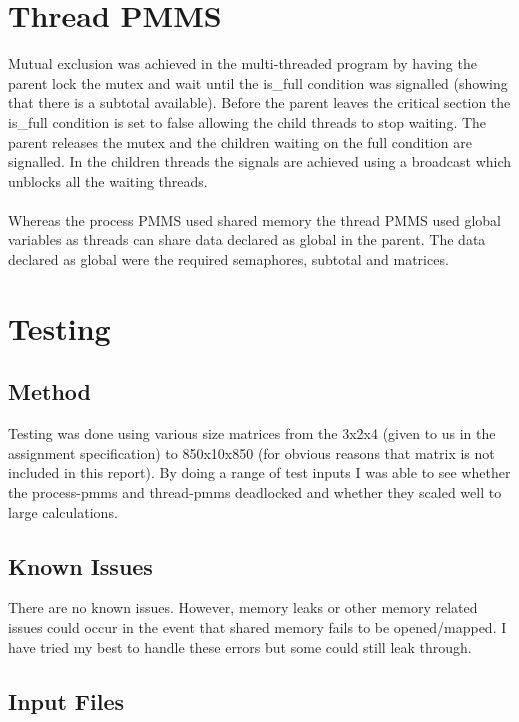 \documentclass{article}
\begin{document}
\section{Thread PMMS}
Mutual exclusion was achieved in the multi-threaded program by having the
parent lock the mutex and wait until the is\_full condition was signalled
(showing that there is a subtotal available). Before the parent leaves the
critical section the is\_full condition is set to false allowing the child
threads to stop waiting. The parent releases the mutex and the children waiting
on the full condition are signalled. In the children threads the signals are
achieved using a broadcast which unblocks all the waiting threads.
\\\\
Whereas the process PMMS used shared memory the thread PMMS used global
variables as threads can share data declared as global in the parent. The data
declared as global were the required semaphores, subtotal and matrices.

\section{Testing}

\subsection{Method}
Testing was done using various size matrices from the 3x2x4 (given to us in the
assignment specification) to 850x10x850 (for obvious reasons that matrix is not
included in this report). By doing a range of test inputs I was able to see
whether the process-pmms and thread-pmms deadlocked and whether they scaled well
to large calculations.
\subsection{Known Issues}
There are no known issues. However, memory leaks or other memory related issues
could occur in the event that shared memory fails to be opened/mapped. I have
tried my best to handle these errors but some could still leak through.
\subsection{Input Files}
        \hangindent
\end{document}
